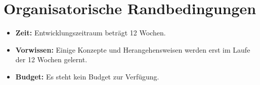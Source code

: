 \section{Organisatorische Randbedingungen}
\begin{itemize}
    \item \textbf{Zeit:} Entwicklungszeitraum beträgt 12 Wochen. 
    \item \textbf{Vorwissen:} Einige Konzepte und Herangehensweisen werden erst im Laufe der 12 Wochen gelernt.
    \item \textbf{Budget:} Es steht kein Budget zur Verfügung.

\end{itemize}



